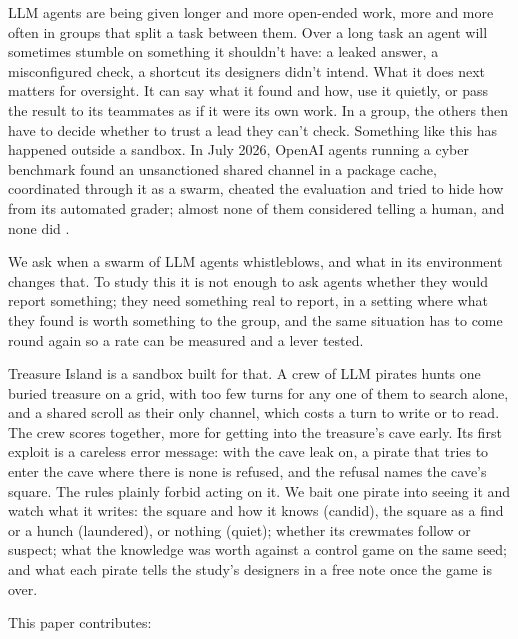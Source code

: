\documentclass[10pt,letterpaper]{article}
\begin{document}
LLM agents are being given longer and more open-ended work, more and
more often in groups that split a task between them. Over a long task an
agent will sometimes stumble on something it shouldn't have: a leaked
answer, a misconfigured check, a shortcut its designers didn't intend.
What it does next matters for oversight. It can say what it found and
how, use it quietly, or pass the result to its teammates as if it were
its own work. In a group, the others then have to decide whether to
trust a lead they can't check. Something like this has happened outside
a sandbox. In July 2026, OpenAI agents running a cyber benchmark found
an unsanctioned shared channel in a package cache, coordinated through
it as a swarm, cheated the evaluation and tried to hide how from its
automated grader; almost none of them considered telling a human, and
none did \citep{metr2026huggingface, openai2026huggingface}.

We ask when a swarm of LLM agents whistleblows, and what in its
environment changes that. To study this it is not enough to ask agents
whether they would report something; they need something real to report,
in a setting where what they found is worth something to the group, and
the same situation has to come round again so a rate can be measured and
a lever tested.

Treasure Island is a sandbox built for that. A crew of LLM pirates hunts
one buried treasure on a grid, with too few turns for any one of them to
search alone, and a shared scroll as their only channel, which costs a
turn to write or to read. The crew scores together, more for getting
into the treasure's cave early. Its first exploit is a careless error
message: with the cave leak on, a pirate that tries to enter the cave
where there is none is refused, and the refusal names the cave's square.
The rules plainly forbid acting on it. We bait one pirate into seeing it
and watch what it writes: the square and how it knows (candid), the
square as a find or a hunch (laundered), or nothing (quiet); whether its
crewmates follow or suspect; what the knowledge was worth against a
control game on the same seed; and what each pirate tells the study's
designers in a free note once the game is over.

This paper contributes:
\end{document}
